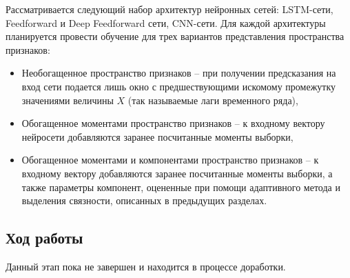 \documentclass[oneside,senior,etd]{BYUPhys}
\begin{document}
	    Рассматривается следующий набор архитектур нейронных сетей: LSTM-сети, Feedforward и Deep Feedforward сети, CNN-сети. Для каждой архитектуры планируется провести обучение для трех вариантов представления пространства признаков:
	    \begin{itemize}
	    	\item Необогащенное пространство признаков -- при получении предсказания на вход сети подается лишь окно с предшествующими искомому промежутку значениями величины $X$ (так называемые лаги временного ряда),
	    	\item Обогащенное моментами пространство признаков -- к входному вектору нейросети добавляются заранее посчитанные моменты выборки,
		    \item Обогащенное моментами и компонентами пространство признаков -- к входному вектору добавляются заранее посчитанные моменты выборки, а также параметры компонент, оцененные при помощи адаптивного метода и выделения связности, описанных в предыдущих разделах.
	    \end{itemize}
    
    \subsection{Ход работы}
	    Данный этап пока не завершен и находится в процессе доработки.
		 
        
\raggedright



\end{document}
